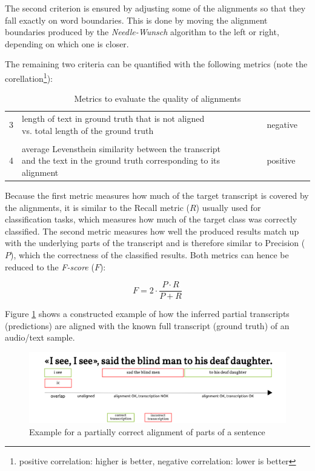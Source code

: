 The second criterion is ensured by adjusting some of the alignments so that they fall exactly on word boundaries. This is done by moving the alignment boundaries produced by the \textit{Needle-Wunsch} algorithm to the left or right, depending on which one is closer. 

The remaining two criteria can be quantified with the following metrics (note the corellation\footnote{positive correlation: higher is better, negative correlation: lower is better}):

\begin{table}[!htbp]
	\centering
	\begin{tabular}{llll}
		\toprule
		\thead{criterion} & \thead{metric} & \thead{correlation} \\
		\midrule
		3 & \makecell[l]{length of text in ground truth that is not aligned\\vs. total length of the ground truth} & negative\\ \\ 	
		4 & \makecell[l]{average Levensthein similarity between the transcript\\and the text in the ground truth corresponding to its alignment} & positive \\ 
		\bottomrule
	\end{tabular}
	\caption{Metrics to evaluate the quality of alignments}
	\label{LM_evaluation}
\end{table}

Because the first metric measures how much of the target transcript is covered by the alignments, it is similar to the Recall metric ($R$) usually used for classification tasks, which measures how much of the target class was correctly classified. The second metric measures how well the produced results match up with the underlying parts of the transcript and is therefore similar to Precision ($P$), which the correctness of the classified results. Both metrics can hence be reduced to the \textit{F-score} ($F$):

\[ 
F = 2\cdot \frac{P\cdot R}{P+R}
 \]

Figure \ref{example_alignment} shows a constructed example of how the inferred partial transcripts (predictions) are aligned with the known full transcript (ground truth) of an audio/text sample.

\begin{figure}
	\includegraphics[width=\linewidth]{./img/example_alignment.png}
	\caption{Example for a partially correct alignment of parts of a sentence}
	\label{example_alignment}
\end{figure}

